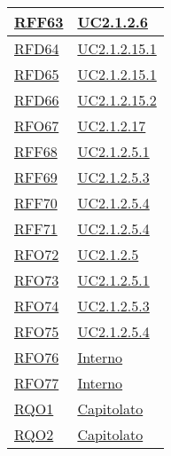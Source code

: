 \begin{longtable}{|>{\centering}m{5cm}|m{5cm}<{\centering}|}
	\hyperlink{RFF63}{RFF63} & \hyperref[UC2.1.2.6]{UC2.1.2.6}\\ \hline
	
	\hyperlink{RFD64}{RFD64} & \hyperref[UC2.1.2.15.1]{UC2.1.2.15.1}\\ \hline
	
	\hyperlink{RFD65}{RFD65} & \hyperref[UC2.1.2.15.1]{UC2.1.2.15.1}\\ \hline
	
	\hyperlink{RFD66}{RFD66} & \hyperref[UC2.1.2.15.2]{UC2.1.2.15.2}\\ \hline
	
	\hyperlink{RFO67}{RFO67} & \hyperref[UC2.1.2.17]{UC2.1.2.17}\\ \hline
	
	\hyperlink{RFF68}{RFF68} & \hyperref[UC2.1.2.5.1]{UC2.1.2.5.1}\\ \hline
	
	\hyperlink{RFF69}{RFF69} & \hyperref[UC2.1.2.5.3]{UC2.1.2.5.3}\\ \hline
	
	\hyperlink{RFF70}{RFF70} & \hyperref[UC2.1.2.5.4]{UC2.1.2.5.4}\\ \hline
	
	\hyperlink{RFF71}{RFF71} & \hyperref[UC2.1.2.5.4]{UC2.1.2.5.4}\\ \hline
	
	\hyperlink{RFO72}{RFO72} & \hyperref[UC2.1.2.5]{UC2.1.2.5}\\ \hline
	
	\hyperlink{RFO73}{RFO73} & \hyperref[UC2.1.2.5.1]{UC2.1.2.5.1}\\ \hline
	
	\hyperlink{RFO74}{RFO74} & \hyperref[UC2.1.2.5.3]{UC2.1.2.5.3}\\ \hline
	
	\hyperlink{RFO75}{RFO75} & \hyperref[UC2.1.2.5.4]{UC2.1.2.5.4}\\ \hline
	
	\hyperlink{RFO76}{RFO76} & \hyperref[Interno]{Interno}\\ \hline
	
	\hyperlink{RFO77}{RFO77} & \hyperref[Interno]{Interno}\\ \hline
	
	\hyperlink{RQO1}{RQO1} & \hyperref[Capitolato]{Capitolato}\\ \hline
	
	\hyperlink{RQO2}{RQO2} & \hyperref[Capitolato]{Capitolato}\\ \hline
	

\end{longtable}
